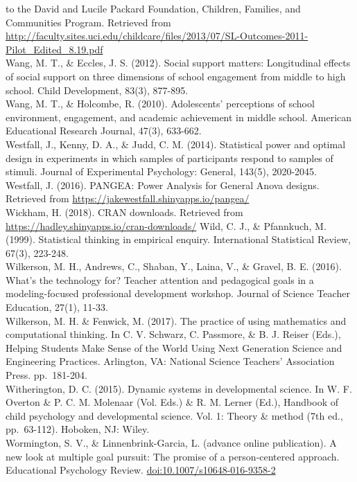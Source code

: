 \documentclass[]{msu-thesis}
\theoremstyle{definition}
\theoremstyle{definition}
\theoremstyle{definition}
\theoremstyle{remark}
\begin{document}
to the David and Lucile Packard Foundation, Children, Families, and
Communities Program. Retrieved from
\url{http://faculty.sites.uci.edu/childcare/files/2013/07/SL-Outcomes-2011-Pilot_Edited_8.19.pdf}\\
Wang, M. T., \& Eccles, J. S. (2012). Social support matters:
Longitudinal effects of social support on three dimensions of school
engagement from middle to high school. Child Development, 83(3),
877-895.\\
Wang, M. T., \& Holcombe, R. (2010). Adolescents' perceptions of school
environment, engagement, and academic achievement in middle school.
American Educational Research Journal, 47(3), 633-662.\\
Westfall, J., Kenny, D. A., \& Judd, C. M. (2014). Statistical power and
optimal design in experiments in which samples of participants respond
to samples of stimuli. Journal of Experimental Psychology: General,
143(5), 2020-2045.\\
Westfall, J. (2016). PANGEA: Power Analysis for General Anova designs.
Retrieved from \url{https://jakewestfall.shinyapps.io/pangea/}\\
Wickham, H. (2018). CRAN downloads. Retrieved from
\url{https://hadley.shinyapps.io/cran-downloads/} Wild, C. J., \&
Pfannkuch, M. (1999). Statistical thinking in empirical enquiry.
International Statistical Review, 67(3), 223-248.\\
Wilkerson, M. H., Andrews, C., Shaban, Y., Laina, V., \& Gravel, B. E.
(2016). What's the technology for? Teacher attention and pedagogical
goals in a modeling-focused professional development workshop. Journal
of Science Teacher Education, 27(1), 11-33.\\
Wilkerson, M. H. \& Fenwick, M. (2017). The practice of using
mathematics and computational thinking. In C. V. Schwarz, C. Passmore,
\& B. J. Reiser (Eds.), Helping Students Make Sense of the World Using
Next Generation Science and Engineering Practices. Arlington, VA:
National Science Teachers' Association Press. pp.~181-204.\\
Witherington, D. C. (2015). Dynamic systems in developmental science. In
W. F. Overton \& P. C. M. Molenaar (Vol. Eds.) \& R. M. Lerner (Ed.),
Handbook of child psychology and developmental science. Vol. 1: Theory
\& method (7th ed., pp.~63-112). Hoboken, NJ: Wiley.\\
Wormington, S. V., \& Linnenbrink-Garcia, L. (advance online
publication). A new look at multiple goal pursuit: The promise of a
person-centered approach. Educational Psychology Review.
\url{doi:10.1007/s10648-016-9358-2}
\end{document}
